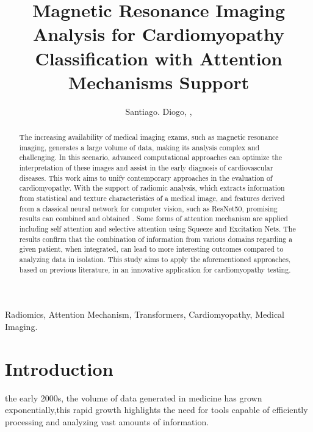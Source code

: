 \documentclass[journal,twoside,web]{ieeecolor}
\begin{document}
\title{Magnetic Resonance Imaging Analysis for Cardiomyopathy Classification with Attention Mechanisms Support}

\author{
   Santiago. Diogo, ,
   
}

\maketitle

\begin{abstract}
The increasing availability of medical imaging exams, such as magnetic resonance imaging, generates a large volume of data, making its analysis complex and challenging. In this scenario, advanced computational approaches can optimize the interpretation of these images and assist in the early diagnosis of cardiovascular diseases. This work aims to unify contemporary approaches in the evaluation of cardiomyopathy. 
With the support of radiomic analysis, which extracts information from statistical and texture characteristics of a medical image, and features derived from a classical neural network for computer vision, such as ResNet50, promising results can combined and obtained \cite{heDeepResidualLearning2015}. Some forms of attention mechanism are applied including self attention and selective attention using Squeeze and Excitation Nets.  The results confirm that the combination of information from various domains regarding a given patient, when integrated, can lead to more interesting outcomes compared to analyzing data in isolation. This study aims to apply the aforementioned approaches, based on previous literature, in an innovative application for cardiomyopathy testing.
\end{abstract}

\begin{IEEEkeywords}
Radiomics, Attention Mechanism, Transformers, Cardiomyopathy, Medical Imaging.
\end{IEEEkeywords}


\section{Introduction}
\label{sec:introduction}
 the early 2000s, the volume of data generated in medicine has grown exponentially,this rapid growth highlights the need for tools capable of efficiently processing and analyzing vast amounts of information.
\end{document}
